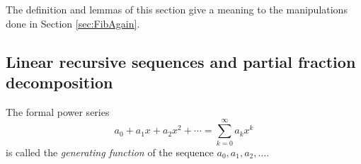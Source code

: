 \begin{page}
\setcounter{section}{2}
\setcounter{subsection}{3}
\setcounter{dfn}{7}
\label{portion:841}



The definition and lemmas of this section give a meaning to the manipulations done in Section \ref{sec:FibAgain}.




\end{page}

\begin{page}
\setcounter{section}{2}
\setcounter{subsection}{3}
\setcounter{dfn}{7}
\label{portion:843}

\subsection{Linear recursive sequences and partial fraction decomposition}

\end{page}

\begin{page}
\setcounter{section}{2}
\setcounter{subsection}{3}
\setcounter{dfn}{8}
\label{portion:845}

\begin{dfn}
The formal power series
\[
a_0 + a_1 x + a_2 x^2 + \cdots = \sum_{k=0}^\infty a_k x^k
\]
is called the \emph{generating function} of the sequence $a_0, a_1, a_2, \ldots$.
\end{dfn}

\end{page}

\begin{page}
\setcounter{section}{2}
\setcounter{subsection}{3}
\setcounter{dfn}{9}
\label{portion:848}


\end{page}

\begin{page}
\setcounter{section}{2}
\setcounter{subsection}{3}
\setcounter{dfn}{9}
\label{portion:849}



\end{page}

